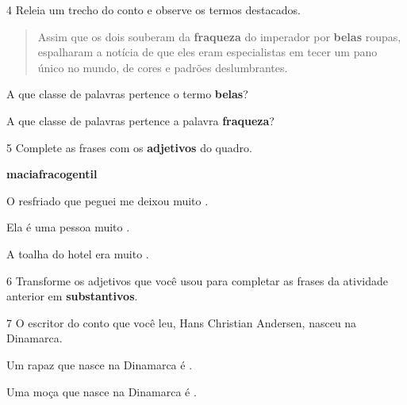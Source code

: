 \num{4} Releia um trecho do conto e observe os termos destacados.

\begin{quote}
Assim que os dois souberam da \textbf{fraqueza} do imperador por
\textbf{belas} roupas, espalharam a notícia de que eles eram
especialistas em tecer um pano único no mundo, de cores e padrões
deslumbrantes.
\end{quote}

\begin{escolha}
\item
A que classe de palavras pertence o termo \textbf{belas}?


\item
A que classe de palavras pertence a palavra \textbf{fraqueza}?

\end{escolha}

\num{5} Complete as frases com os \textbf{adjetivos} do quadro.

\begin{mdframed}[linewidth=2pt,linecolor=salmao,roundcorner=20pt]
\hfill\textbf{macia}\hfill \textbf{fraco}\hfill \textbf{gentil}\hfill
\end{mdframed}

\begin{escolha}
\item O resfriado que peguei me deixou muito .

\item Ela é uma pessoa muito .

\item A toalha do hotel era muito .
\end{escolha}

\num{6} Transforme os adjetivos que você usou para completar as frases da atividade
anterior em \textbf{substantivos}.




\num{7} O escritor do conto que você leu, Hans Christian Andersen, nasceu na Dinamarca.

\begin{escolha}
\item Um rapaz que nasce na Dinamarca é .

\item Uma moça que nasce na Dinamarca é .
\end{escolha}

